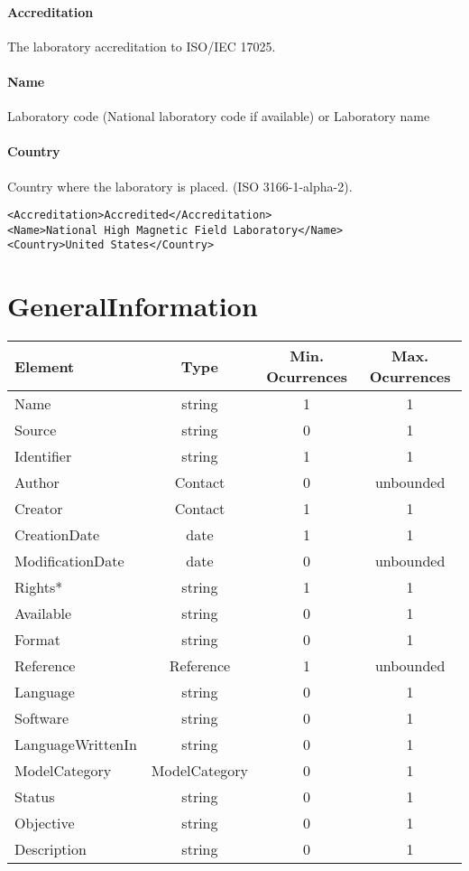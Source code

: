 \documentclass[a4paper]{report}
\begin{document}
\paragraph{Accreditation}
The laboratory accreditation to ISO/IEC 17025.

\paragraph{Name}
Laboratory code (National laboratory code if available) or Laboratory name 

\paragraph{Country}
Country where the laboratory is placed. (ISO 3166-1-alpha-2).

\begin{lstlisting}[basicstyle=\footnotesize, caption={Example of Laboratory}]
<Accreditation>Accredited</Accreditation>
<Name>National High Magnetic Field Laboratory</Name>
<Country>United States</Country>
\end{lstlisting}   


\section{GeneralInformation}

\begin{tabular}{|l|c|c|c|}
    \hline
    \textbf{Element} & \textbf{Type} & \textbf{Min. Ocurrences} & \textbf{Max. Ocurrences} \\
    \hline
    Name & string & 1 & 1 \\
    Source & string & 0 & 1\\
    Identifier & string & 1 & 1 \\
    Author & Contact & 0 & unbounded \\
    Creator & Contact & 1 & 1 \\
    CreationDate & date & 1 & 1 \\
    ModificationDate & date & 0 & unbounded \\
    Rights* & string & 1 & 1 \\
    Available & string & 0 & 1 \\
    Format & string & 0 & 1 \\
    Reference & Reference & 1 & unbounded \\
    Language & string & 0 & 1 \\
    Software & string & 0 & 1 \\
    LanguageWrittenIn & string & 0 & 1 \\
    ModelCategory & ModelCategory & 0 & 1 \\
    Status & string & 0 & 1 \\
    Objective & string & 0 & 1 \\
    Description & string & 0 & 1 \\
    \hline
\end{tabular}
\end{document}
